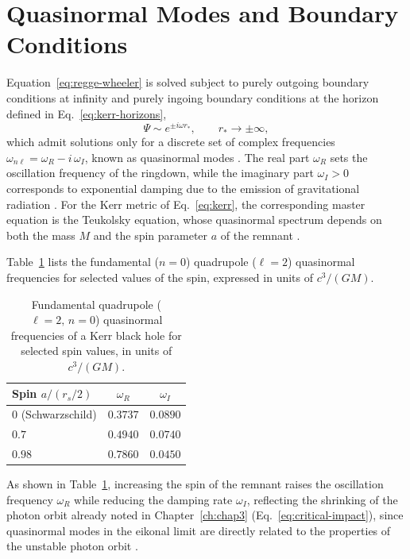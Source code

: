 \section{Quasinormal Modes and Boundary Conditions}

Equation~\eqref{eq:regge-wheeler} is solved subject to purely outgoing boundary conditions at infinity and purely ingoing boundary conditions at the horizon defined in Eq.~\eqref{eq:kerr-horizons},
\begin{equation}
	\Psi \sim e^{\pm i\omega r_*}, \qquad r_* \to \pm\infty,
	\label{eq:qnm-bc}
\end{equation}
which admit solutions only for a discrete set of complex frequencies $\omega_{n\ell} = \omega_{R} - i\,\omega_{I}$, known as quasinormal modes \cite{leaver1985}. The real part $\omega_R$ sets the oscillation frequency of the ringdown, while the imaginary part $\omega_I>0$ corresponds to exponential damping due to the emission of gravitational radiation \cite{berti2009}. For the Kerr metric of Eq.~\eqref{eq:kerr}, the corresponding master equation is the Teukolsky equation, whose quasinormal spectrum depends on both the mass $M$ and the spin parameter $a$ of the remnant \cite{teukolsky1973}.

Table~\ref{tab:qnm} lists the fundamental ($n=0$) quadrupole ($\ell=2$) quasinormal frequencies for selected values of the spin, expressed in units of $c^3/(GM)$.

\begin{table}[H]
	\centering
	\caption{Fundamental quadrupole ($\ell=2,\,n=0$) quasinormal frequencies of a Kerr black hole for selected spin values, in units of $c^3/(GM)$.}
	\label{tab:qnm}
	\begin{tabular}{lcc}
		\hline
		\textbf{Spin $a/(r_s/2)$} & \textbf{$\omega_R$} & \textbf{$\omega_I$} \\
		\hline
		$0$ (Schwarzschild) \cite{leaver1985} & $0.3737$ & $0.0890$ \\
		$0.7$ \cite{berti2009} & $0.4940$ & $0.0740$ \\
		$0.98$ \cite{berti2009} & $0.7860$ & $0.0450$ \\
		\hline
	\end{tabular}
\end{table}

As shown in Table~\ref{tab:qnm}, increasing the spin of the remnant raises the oscillation frequency $\omega_R$ while reducing the damping rate $\omega_I$, reflecting the shrinking of the photon orbit already noted in Chapter~\ref{ch:chap3} (Eq.~\eqref{eq:critical-impact}), since quasinormal modes in the eikonal limit are directly related to the properties of the unstable photon orbit \cite{berti2009}.

